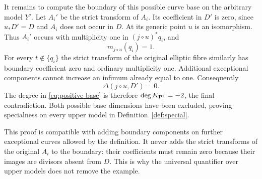 It remains to compute the boundary of this possible curve base on the
arbitrary model $Y'$. Let $A_i'$ be the strict transform of $A_i$.
Its coefficient in $D'$ is zero, since $u_*D'=D$ and $A_i$ does not
occur in $D$. At its generic point $u$ is an isomorphism. Thus $A_i'$
occurs with multiplicity one in $(j\circ u)^*q_i$, and
\[
 m_{j\circ u}(q_i)=1.
\]
For every $t\notin\{q_i\}$ the strict transform of the original elliptic
fibre similarly has boundary coefficient zero and ordinary multiplicity
one. Additional exceptional components cannot increase an infimum
already equal to one. Consequently
\[
 \Delta(j\circ u,D')=0.
\]
The degree in \eqref{eq:positive-base} is therefore $\deg K_{\mathbf P^1}=-2$,
the final contradiction. Both possible base dimensions have been
excluded, proving specialness on every upper model in
Definition~\ref{def:special}.

\begin{remark}
This proof is compatible with adding boundary components on further
exceptional curves allowed by the definition. It never adds the
strict transforms of the original $A_i$ to the boundary: their
coefficients must remain zero because their images are divisors absent
from $D$. This is why the universal quantifier over upper models does
not remove the example.
\end{remark}
